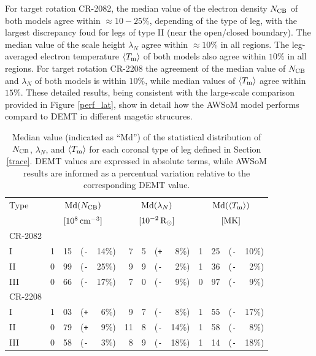 \documentclass[namedreferences]{solarphysics}
\newcommand{\mrsun}{{\rm R_\odot}}
\newcommand{\med}{{\rm Md}}
\newcommand{\avgTe}{\left<\Tm\right>}
\newcommand{\MK}{{\rm MK}}
\newcommand{\lN}{\lambda_N}
\newcommand{\NCB}{N_{\rm CB}}
\newcommand{\Tm}{T_{\rm m}}
\newcommand{\aTm}{\left<\Tm\right>}
\newcommand{\Pl}{\texttt{+}}
\newcommand{\Mi}{\texttt{-}}
\begin{document}
\begin{article}
{For target rotation CR-2082, the median value of the electron density $\NCB$ of both models agree within $\approx 10-25\%$, {depending of the type of leg, with the largest discrepancy foud for legs of type II (near the open/closed boundary). The} median value of the scale height $\lN$ agree {within $\approx 10\%$ in all regions}. The leg-averaged electron temperature $\aTm$ of both models also agree {within $10\%$ in all regions}. For target rotation CR-2208 the agreement of the median value of $\NCB$ and $\lN$ of both models {is within $10\%$, while} median values of $\aTm$ agree within $15\%$. {These detailed results, being consistent with the large-scale comparison provided in Figure \ref{perf_lat}, show in detail how the AWSoM model performs compard to DEMT in different magetic strucures.}}


\begin{table}
\begin{tabular}{l r@{.}l@{\hskip 0.05in} r@{\hskip 0.01in} r  r@{.}l@{\hskip 0.05in} r@{\hskip 0.01in} r r@{.}l@{\hskip 0.05in} r@{\hskip 0.01in} r }
\hline
Type    & \multicolumn{4}{c}{$\med(\NCB)$}             & \multicolumn{4}{c}{$\med(\lN)$} & \multicolumn{4}{c}{$\med(\avgTe)$} \\
        & \multicolumn{4}{c}{$[10^8\,{\rm cm}^{-3}]$}  & \multicolumn{4}{c}{$[{\rm 10}^{-2}\,\mrsun]$} & \multicolumn{4}{c}{$[\MK]$} \\
\hline
CR-2082\\
I    & 1&15 &(\Mi&14\%)  &   7&5 &(\Pl&~8\%) &   1&25 &(\Mi&10\%) \\
II   & 0&99 &(\Mi&25\%)  &   9&9 &(\Mi&~2\%) &   1&36 &(\Mi&~2\%) \\
III  & 0&66 &(\Mi&17\%)  &   7&0 &(\Mi&~9\%) &   0&97 &(\Mi&~9\%) \\
\hline          
CR-2208\\
I    & 1&03 &(\Pl&~6\%)  &   9&7 &(\Mi&~8\%) &   1&55 &(\Mi&17\%) \\
II   & 0&79 &(\Pl&~9\%)  &  11&8 &(\Mi&14\%) &   1&58 &(\Mi&~8\%) \\
III  & 0&58 &(\Mi&~3\%)  &   8&9 &(\Mi&18\%) &   1&14 &(\Mi&18\%) \\
\hline   
\end{tabular}
\caption{Median value (indicated as ``Md'') of the statistical distribution of $\NCB$, $\lN$, and $\aTm$ for each coronal type of leg defined in Section \ref{trace}. DEMT values are expressed in absolute terms, while AWSoM results are informed as a percentual variation relative to the corresponding DEMT value.}
\label{tabla_comp}
\end{table}


\end{article}
\end{document}
